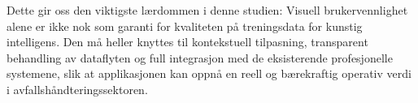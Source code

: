Dette gir oss den viktigste lærdommen i denne studien: Visuell brukervennlighet alene er ikke nok som garanti for kvaliteten på treningsdata for kunstig intelligens. Den må heller knyttes til kontekstuell tilpasning, transparent behandling av dataflyten og full integrasjon med de eksisterende profesjonelle systemene, slik at applikasjonen kan oppnå en reell og bærekraftig operativ verdi i avfallshåndteringssektoren.